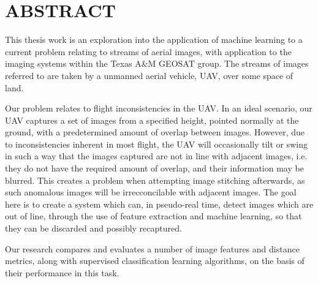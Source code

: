 %
%
%

\chapter*{ABSTRACT}

\pagestyle{plain} %
\setcounter{page}{2}

\indent This thesis work is an exploration into the application of machine learning to a current problem relating to streams of aerial images, with application to the imaging systems within the Texas A\&M GEOSAT group.
The streams of images referred to are taken by a unmanned aerial vehicle, UAV, over some space of land.

Our problem relates to flight inconsistencies in the UAV.
In an ideal scenario, our UAV captures a set of images from a specified height, pointed normally at the ground, with a predetermined amount of overlap between images.
However, due to inconsistencies inherent in most flight, the UAV will occasionally tilt or swing in such a way that the images captured are not in line with adjacent images, i.e. they do not have the required amount of overlap, and their information may be blurred.
This creates a problem when attempting image stitching afterwards, as such anomalous images will be irrecconcilable with adjacent images.
The goal here is to create a system which can, in pseudo-real time, detect images which are out of line, through the use of feature extraction and machine learning, so that they can be discarded and possibly recaptured.

Our research compares and evaluates a number of image features and distance metrics, along with supervised classification learning algorithms, on the basis of their performance in this task.



 

\pagebreak{}

